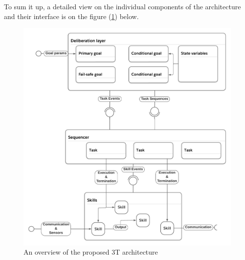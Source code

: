 \documentclass[main.tex]{subfiles}
\begin{document}
To sum it up, a detailed view on the individual components of the architecture and their
interface is on the figure (\ref{arch-proposal}) below.

\begin{figure}[htbp]
    \centering
    \includegraphics[width=\textwidth]{architecture-proposal.png}
    \caption{An overview of the proposed 3T architecture}
    \label{arch-proposal}
\end{figure}

\end{document}
